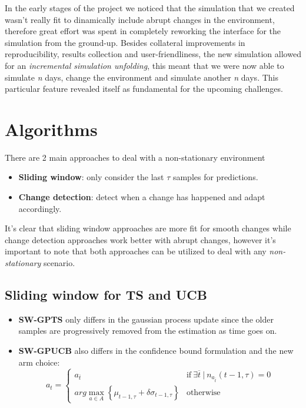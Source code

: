 In the early stages of the project we noticed that the simulation that we created wasn't really fit to dinamically include abrupt changes in the environment, therefore great effort was spent in completely reworking the interface for the simulation from the ground-up.
Besides collateral improvements in reproducibility, results collection and user-friendliness, the new simulation allowed for an \textit{incremental simulation unfolding}, this meant that we were now able to simulate \textit{n} days, change the environment and simulate another \textit{n} days.
This particular feature revealed itself as fundamental for the upcoming challenges.

\section{Algorithms}

There are 2 main approaches to deal with a non-stationary environment

\begin{itemize}
    \item \textbf{Sliding window}: only consider the last $\tau$ samples for predictions.
    \item \textbf{Change detection}: detect when a change has happened and adapt accordingly.
\end{itemize}

It's clear that sliding window approaches are more fit for smooth changes while change detection approaches work better with abrupt changes, however it's important to note that both approaches can be utilized to deal with any \textit{non-stationary} scenario.

\subsection{Sliding window for TS and UCB}

\begin{itemize}
    \item \textbf{SW-GPTS} only differs in the gaussian process update since the older samples are progressively removed from the estimation as time goes on.
    \item \textbf{SW-GPUCB} also differs in the confidence bound formulation and the new arm choice:
        \begin{displaymath}
            a_t =
            \begin{cases}
                a_{\overline{t}} & \text{if} ~ \exists \overline{t} ~ | ~ n_{a_{\overline{t}}}(t-1, \tau) = 0 \\
                arg\max_{a \in A} \left\{ \mu_{t-1, \tau} + \delta \sigma_{t-1, \tau} \right\} & \text{otherwise}
            \end{cases}
        \end{displaymath}
\end{itemize}

